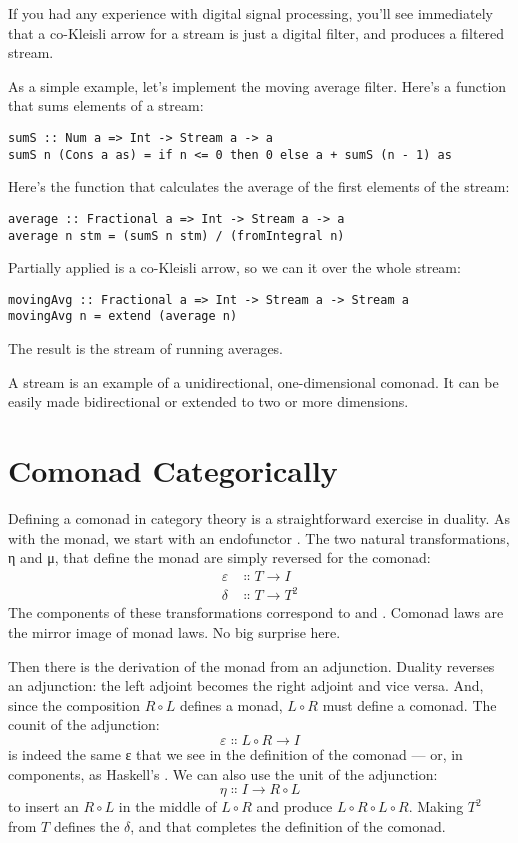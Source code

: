 If you had any experience with digital signal processing, you'll see
immediately that a co-Kleisli arrow for a stream is just a digital
filter, and  produces a filtered stream.

As a simple example, let's implement the moving average filter. Here's a
function that sums  elements of a stream:

\begin{Verbatim}
sumS :: Num a => Int -> Stream a -> a
sumS n (Cons a as) = if n <= 0 then 0 else a + sumS (n - 1) as
\end{Verbatim}
Here's the function that calculates the average of the first 
elements of the stream:

\begin{Verbatim}
average :: Fractional a => Int -> Stream a -> a
average n stm = (sumS n stm) / (fromIntegral n)
\end{Verbatim}
Partially applied  is a co-Kleisli arrow, so we can
 it over the whole stream:

\begin{Verbatim}
movingAvg :: Fractional a => Int -> Stream a -> Stream a
movingAvg n = extend (average n)
\end{Verbatim}
The result is the stream of running averages.

A stream is an example of a unidirectional, one-dimensional comonad. It
can be easily made bidirectional or extended to two or more dimensions.

\section{Comonad Categorically}

Defining a comonad in category theory is a straightforward exercise in
duality. As with the monad, we start with an endofunctor . The
two natural transformations, η and μ, that define the monad are simply
reversed for the comonad:
\begin{align*}
\varepsilon &\Colon T \to I \\
\delta &\Colon T \to T^2
\end{align*}
The components of these transformations correspond to 
and . Comonad laws are the mirror image of monad laws.
No big surprise here.

Then there is the derivation of the monad from an adjunction. Duality
reverses an adjunction: the left adjoint becomes the right adjoint and
vice versa. And, since the composition $R \circ L$ defines a monad,
$L \circ R$ must define a comonad. The counit of the adjunction:
\[\varepsilon \Colon L \circ R \to I\]
is indeed the same ε that we see in the definition of the comonad ---
or, in components, as Haskell's . We can also use the
unit of the adjunction:
\[\eta \Colon I \to R \circ L\]
to insert an $R \circ L$ in the middle of $L \circ R$ and
produce $L \circ R \circ L \circ R$. Making $T^2$ from $T$
defines the $\delta$, and that completes the definition of the comonad.

